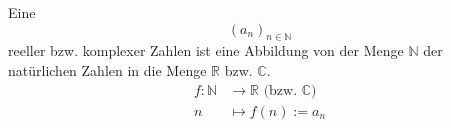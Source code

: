Eine  $$(a_n)_{n \in \mathbb{N}}$$ reeller bzw. komplexer Zahlen ist eine Abbildung von der Menge $\mathbb{N}$ der natürlichen Zahlen in die Menge $\mathbb{R}$ bzw. $\mathbb{C}$.
\begin{align*}
    f : \mathbb{N} & \longrightarrow \mathbb{R} \text{ (bzw. } \mathbb{C} \text{)} \\
    n & \longmapsto f(n) := a_n
\end{align*}